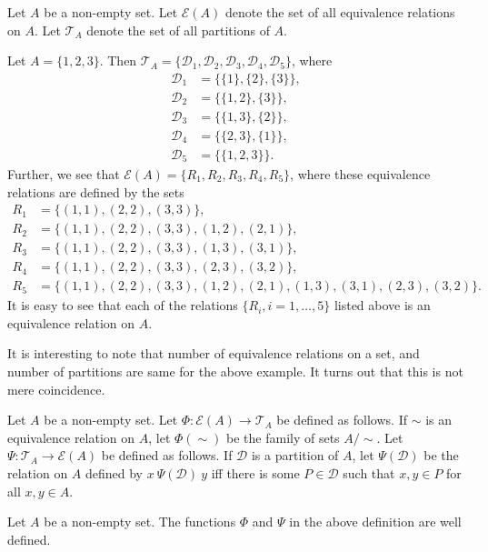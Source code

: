 \documentclass[a4paper,english,12pt]{article}
\begin{document}
\begin{defn} 
	Let $A$ be a non-empty set. Let $\mathcal{E}(A)$ denote the set of all equivalence relations on $A$. Let $\mathcal{T}_A$ denote the set of all partitions of $A$.
\end{defn}
\begin{exmp}\label{Exmp:BijPartRel}
	Let $A=\{1,2,3\}$. Then $\mathcal{T}_A = \{\mathcal{D}_1, \mathcal{D}_2,\mathcal{D}_3, \mathcal{D}_4,\mathcal{D}_5\}$, where
	\begin{align*}
	\mathcal{D}_1 &= \{\{1\},\{2\},\{3\}\},\\
	\mathcal{D}_2 &= \{\{1,2\},\{3\}\},\\
	\mathcal{D}_3 &= \{\{1,3\},\{2\}\},\\
	\mathcal{D}_4 &= \{\{2,3\},\{1\}\},\\
	\mathcal{D}_5 &= \{\{1,2,3\}\}.
	\end{align*}
	Further,  we see that $\mathcal{E}(A) = \{R_1, R_2, R_3, R_4, R_5\}$, where these equivalence relations are defined by the sets
	\begin{align*}
	R_1 &= \{(1,1),(2,2),(3,3)\},\\
	R_2 &= \{(1,1),(2,2),(3,3),(1,2),(2,1)\},\\
	R_3 &= \{(1,1),(2,2),(3,3),(1,3),(3,1)\},\\
	R_4 &= \{(1,1),(2,2),(3,3),(2,3),(3,2)\},\\
	R_5 &= \{(1,1),(2,2),(3,3),(1,2),(2,1),(1,3),(3,1),(2,3),(3,2)\}.
	\end{align*}
It is easy to see that each of the relations $\{R_i, i = 1, \ldots, 5\}$ listed above is an equivalence relation on $A$.
\end{exmp}
It is interesting to note that number of equivalence relations on a set, and number of partitions are same for the above example. It turns out that this is not mere coincidence.
\begin{defn} Let $A$ be a non-empty set. Let $\Phi : \mathcal{E}(A) \rightarrow \mathcal{T}_A$ be defined as follows. If $\sim$ is an equivalence relation on $A$, let $\Phi(\sim)$ be the family of sets $A/\sim$. Let $\Psi : \mathcal{T}_A \rightarrow \mathcal{E}(A)$ be defined as follows. If $\mathcal{D}$ is a partition of $A$, let $\Psi(\mathcal{D})$ be the relation on $A$ defined by $x \: \Psi(\mathcal{D}) \: y$ iff there is some $P \in \mathcal{D}$ such that $x,y \in P$ for all $x,y \in A$.
\end{defn}
\begin{lem}
	Let $A$ be a non-empty set. The functions $\Phi$ and $\Psi$ in the above definition are well defined.
\end{lem}
\end{document}
